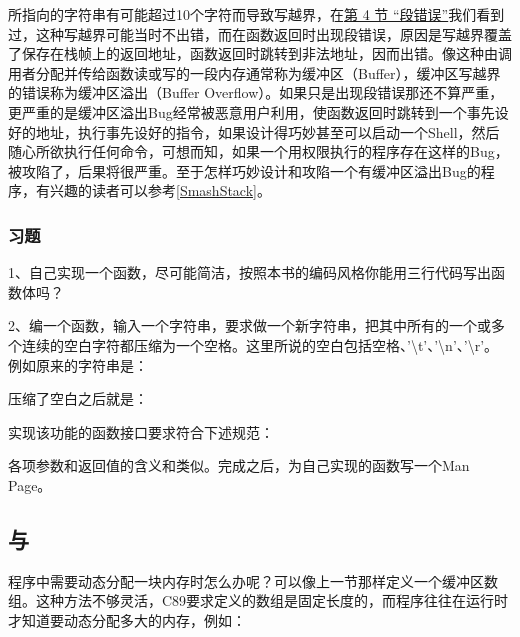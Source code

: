 

所指向的字符串有可能超过10个字符而导致写越界，在\hyperlink{db.ch10s04.id2742403}{第 4 节 “段错误”}我们看到过，这种写越界可能当时不出错，而在函数返回时出现段错误，原因是写越界覆盖了保存在栈帧上的返回地址，函数返回时跳转到非法地址，因而出错。像这种由调用者分配并传给函数读或写的一段内存通常称为缓冲区（Buffer），缓冲区写越界的错误称为缓冲区溢出（Buffer Overflow）。如果只是出现段错误那还不算严重，更严重的是缓冲区溢出Bug经常被恶意用户利用，使函数返回时跳转到一个事先设好的地址，执行事先设好的指令，如果设计得巧妙甚至可以启动一个Shell，然后随心所欲执行任何命令，可想而知，如果一个用权限执行的程序存在这样的Bug，被攻陷了，后果将很严重。至于怎样巧妙设计和攻陷一个有缓冲区溢出Bug的程序，有兴趣的读者可以参考\hyperlink{db.bi01.bibli.smashstack}{[SmashStack]}。


\subsubsection*{习题}
%


1、自己实现一个函数，尽可能简洁，按照本书的编码风格你能用三行代码写出函数体吗？



2、编一个函数，输入一个字符串，要求做一个新字符串，把其中所有的一个或多个连续的空白字符都压缩为一个空格。这里所说的空白包括空格、'\textbackslash{}t'、'\textbackslash{}n'、'\textbackslash{}r'。例如原来的字符串是：




压缩了空白之后就是：




实现该功能的函数接口要求符合下述规范：




各项参数和返回值的含义和类似。完成之后，为自己实现的函数写一个Man Page。


\subsection{与}
%


程序中需要动态分配一块内存时怎么办呢？可以像上一节那样定义一个缓冲区数组。这种方法不够灵活，C89要求定义的数组是固定长度的，而程序往往在运行时才知道要动态分配多大的内存，例如：



